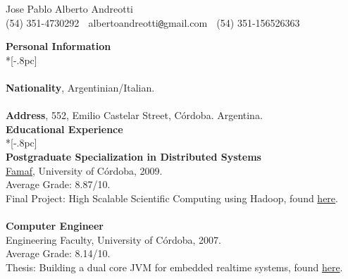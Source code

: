 \documentclass[letter,11pt,english]{article}
\begin{document}
\pagestyle{headings}
\setcounter{page}{1}

\begin{center}
{\Large Jose Pablo Alberto Andreotti} \\[.5pc]
(54) 351-4730292 $\;$ albertoandreotti\verb|@|gmail.com $\;$ (54) 351-156526363 \\[3pc]
\end{center}
{\large \bf Personal Information} \\*[-.8pc]
\underline{\hspace{6in}} \\
\\
{\bf Nationality}, Argentinian/Italian.\\
\\
{\bf Address}, 552, Emilio Castelar Street, C\'ordoba. Argentina.\\

{\large \bf Educational Experience} \\*[-.8pc]
\underline{\hspace{6in}} \\
{\bf Postgraduate Specialization in Distributed Systems}\\
\href{http://www.famaf.unc.edu.ar/}{Famaf}, University of C\'ordoba, 2009. \\
Average Grade: 8.87/10. \\
Final Project: High Scalable Scientific Computing using Hadoop, found \href{https://docs.google.com/viewer?a=v&pid=explorer&chrome=true&srcid=0B5AOpwg8IzVANjJlODZhZDctNWUzMS00MmNhLWI3OWMtMWNhMTdjODQwNjVl&hl=en}{here}.\\
\\
{\bf Computer Engineer}\\
Engineering Faculty, University of C\'ordoba, 2007.\\
Average Grade: 8.14/10. \\
Thesis: Building a dual core JVM for embedded realtime systems, found \href{https://docs.google.com/viewer?a=v&pid=explorer&chrome=true&srcid=1gdJXYgQtLDHDOxGDtbKzdmAl1LmNx-yo4w6vNl-K_Z-1YocLhtJxMvoqGvd1&hl=en}{here}.\\
\end{document}
